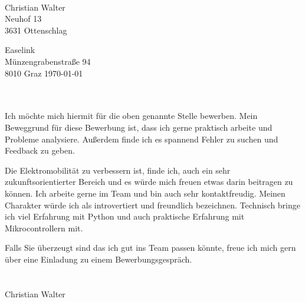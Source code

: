 \documentclass[11pt, a4paper]{article}
\begin{document}
\vspace*{1cm}
\begin{center}
  \\
\end{center}

\vspace{1cm}
Christian Walter\\
Neuhof 13\\
3631 Ottenschlag\\
\vspace{1cm}

Easelink\\
Münzengrabenstraße 94\\
8010 Graz
\hfill
\today\\
\vspace{1cm}

\\\\
Ich möchte mich hiermit für die oben genannte Stelle bewerben.
Mein Beweggrund für diese Bewerbung ist, dass ich gerne praktisch arbeite und Probleme analysiere.
Außerdem finde ich es spannend Fehler zu suchen und Feedback zu geben.

Die Elektromobilität zu verbessern ist, finde ich, auch ein sehr zukunftsorientierter Bereich und es würde mich freuen etwas darin beitragen zu können.
Ich arbeite gerne im Team und bin auch sehr kontaktfreudig.
Meinen Charakter würde ich als introvertiert und freundlich bezeichnen.
Technisch bringe ich viel Erfahrung mit Python und auch praktische Erfahrung mit Mikrocontrollern mit.

Falls Sie überzeugt sind das ich gut ins Team passen könnte, freue ich mich gern über eine Einladung zu einem Bewerbungsgespräch.\\

\\\\ Christian Walter
\end{document}
